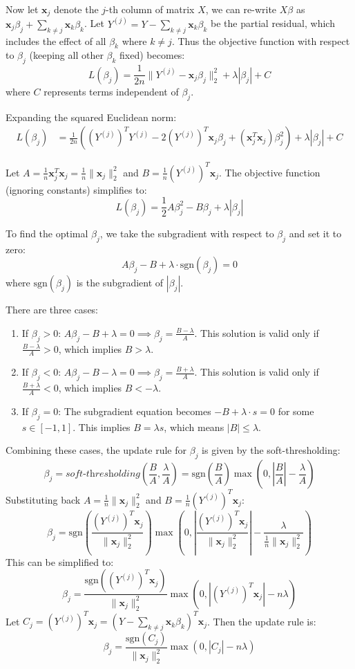 \documentclass[11pt, a4paper, oneside]{memoir}
\begin{document}
Now let $\mathbf{x}_j$ denote the $j$-th column of matrix $X$, we can re-write $X\beta$ as $\mathbf{x}_j\beta_j + \sum_{k \neq j} \mathbf{x}_k\beta_k$. Let $Y^{(j)} = Y - \sum_{k \neq j} \mathbf{x}_k\beta_k$ be the partial residual, which includes the effect of all $\beta_k$ where $k \neq j$.
Thus the objective function with respect to $\beta_j$ (keeping all other $\beta_k$ fixed) becomes:
\[ L(\beta_j) = \frac{1}{2n} \|Y^{(j)} - \mathbf{x}_j\beta_j\|_2^2 + \lambda |\beta_j| + C \]
where $C$ represents terms independent of $\beta_j$.

Expanding the squared Euclidean norm:
\begin{align*}
L(\beta_j) &= \frac{1}{2n} \left( (Y^{(j)})^T Y^{(j)} - 2(Y^{(j)})^T \mathbf{x}_j\beta_j + (\mathbf{x}_j^T \mathbf{x}_j)\beta_j^2 \right) + \lambda |\beta_j| + C
\end{align*}

Let $A = \frac{1}{n} \mathbf{x}_j^T \mathbf{x}_j = \frac{1}{n} \|\mathbf{x}_j\|_2^2$ and $B = \frac{1}{n} (Y^{(j)})^T \mathbf{x}_j$. The objective function (ignoring constants) simplifies to:
\[ L(\beta_j) = \frac{1}{2} A \beta_j^2 - B \beta_j + \lambda |\beta_j| \]

To find the optimal $\beta_j$, we take the subgradient with respect to $\beta_j$ and set it to zero:
\[ A\beta_j - B + \lambda \cdot \text{sgn}(\beta_j) = 0 \]
where $\text{sgn}(\beta_j)$ is the subgradient of $|\beta_j|$.

There are three cases:
\begin{enumerate}
    \item If $\beta_j > 0$: $A\beta_j - B + \lambda = 0 \implies \beta_j = \frac{B - \lambda}{A}$. This solution is valid only if $\frac{B - \lambda}{A} > 0$, which implies $B > \lambda$.
    \item If $\beta_j < 0$: $A\beta_j - B - \lambda = 0 \implies \beta_j = \frac{B + \lambda}{A}$. This solution is valid only if $\frac{B + \lambda}{A} < 0$, which implies $B < -\lambda$.
    \item If $\beta_j = 0$: The subgradient equation becomes $-B + \lambda \cdot s = 0$ for some $s \in [-1, 1]$. This implies $B = \lambda s$, which means $|B| \leq \lambda$.
\end{enumerate}
Combining these cases, the update rule for $\beta_j$ is given by the soft-thresholding:
\[ \beta_j = \textit{soft-thresholding}(\frac{B}{A}, \frac{\lambda}{A}) = \text{sgn}(\frac{B}{A}) \max\left(0, |\frac{B}{A}| - \frac{\lambda}{A}\right) \]
Substituting back $A = \frac{1}{n} \|\mathbf{x}_j\|_2^2$ and $B = \frac{1}{n} (Y^{(j)})^T \mathbf{x}_j$:
\[ \beta_j = \text{sgn}\left( \frac{(Y^{(j)})^T \mathbf{x}_j}{\|\mathbf{x}_j\|_2^2} \right) \max\left(0, \left| \frac{(Y^{(j)})^T \mathbf{x}_j}{\|\mathbf{x}_j\|_2^2} \right| - \frac{\lambda}{\frac{1}{n}\|\mathbf{x}_j\|_2^2} \right) \]
This can be simplified to:
\[ \beta_j = \frac{\text{sgn}((Y^{(j)})^T \mathbf{x}_j)}{\|\mathbf{x}_j\|_2^2} \max\left(0, |(Y^{(j)})^T \mathbf{x}_j| - n\lambda \right) \]
Let $C_j = (Y^{(j)})^T \mathbf{x}_j = (Y - \sum_{k \neq j} \mathbf{x}_k\beta_k)^T \mathbf{x}_j$. Then the update rule is:
\[ \beta_j = \frac{\text{sgn}(C_j)}{\|\mathbf{x}_j\|_2^2} \max\left(0, |C_j| - n\lambda \right) \]
\end{document}

